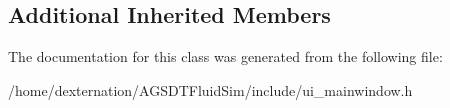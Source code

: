 \subsection*{Additional Inherited Members}


The documentation for this class was generated from the following file\-:\begin{DoxyCompactItemize}
\item 
/home/dexternation/\-A\-G\-S\-D\-T\-Fluid\-Sim/include/ui\-\_\-mainwindow.\-h\end{DoxyCompactItemize}
